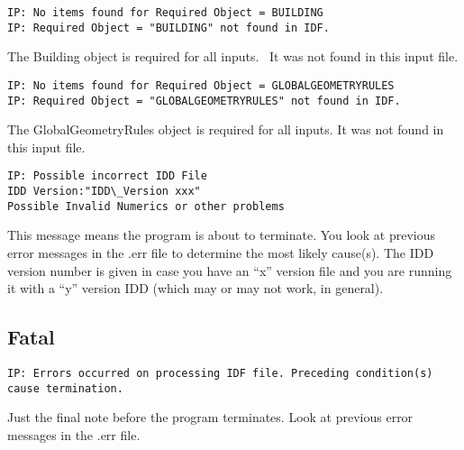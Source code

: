 \begin{lstlisting}
IP: No items found for Required Object = BUILDING
IP: Required Object = "BUILDING" not found in IDF.
\end{lstlisting}

The Building object is required for all inputs.~ It was not found in this input file.

\begin{lstlisting}
IP: No items found for Required Object = GLOBALGEOMETRYRULES
IP: Required Object = "GLOBALGEOMETRYRULES" not found in IDF.
\end{lstlisting}

The GlobalGeometryRules object is required for all inputs. It was not found in this input file.

\begin{lstlisting}
IP: Possible incorrect IDD File
IDD Version:"IDD\_Version xxx"
Possible Invalid Numerics or other problems
\end{lstlisting}

This message means the program is about to terminate. You look at previous error messages in the .err file to determine the most likely cause(s). The IDD version number is given in case you have an ``x'' version file and you are running it with a ``y'' version IDD (which may or may not work, in general).

\subsection{Fatal}\label{fatal-001}

\begin{lstlisting}
IP: Errors occurred on processing IDF file. Preceding condition(s) cause termination.
\end{lstlisting}

Just the final note before the program terminates. Look at previous error messages in the .err file.
